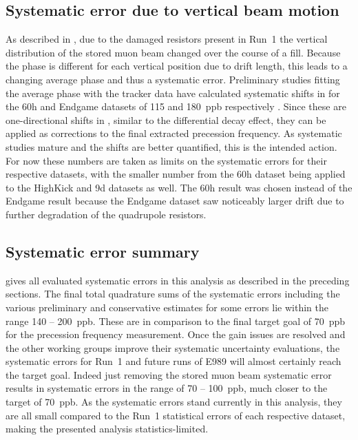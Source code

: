 \subsection{Systematic error due to vertical beam motion}


As described in , due to the damaged resistors present in Run~1 the vertical distribution of the stored muon beam changed over the course of a fill. Because the \gmtwo phase is different for each vertical position due to drift length, this leads to a changing average phase and thus a systematic error. Preliminary studies fitting the average \gmtwo phase with the tracker data have calculated systematic shifts in \wa for the 60h and Endgame datasets of \SI{115}{} and \SI{180}{ppb} respectively \cite{BadResistorsVolodya}. Since these are one-directional shifts in \wa, similar to the differential decay effect, they can be applied as corrections to the final extracted precession frequency. As systematic studies mature and the shifts are better quantified, this is the intended action. For now these numbers are taken as limits on the systematic errors for their respective datasets, with the smaller number from the 60h dataset being applied to the HighKick and 9d datasets as well. The 60h result was chosen instead of the Endgame result because the Endgame dataset saw noticeably larger drift due to further degradation of the quadrupole resistors.




\subsection{Systematic error summary}

 gives all evaluated systematic errors in this analysis as described in the preceding sections. The final total quadrature sums of the systematic errors including the various preliminary and conservative estimates for some errors lie within the range \SI{140}{} -- \SI{200}{ppb}. These are in comparison to the final target goal of \SI{70}{ppb} for the precession frequency measurement. Once the gain issues are resolved and the other working groups improve their systematic uncertainty evaluations, the systematic errors for Run~1 and future runs of E989 will almost certainly reach the target goal. Indeed just removing the stored muon beam systematic error results in systematic errors in the range of \SI{70}{} -- \SI{100}{ppb}, much closer to the target of \SI{70}{ppb}. As the systematic errors stand currently in this analysis, they are all small compared to the Run~1 statistical errors of each respective dataset, making the presented analysis statistics-limited. 



